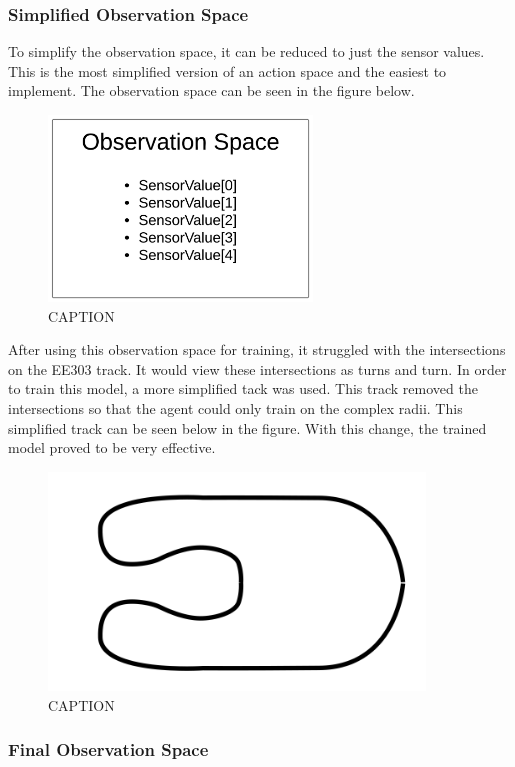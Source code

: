 \documentclass[12pt]{article}
\begin{document}
\subsubsection{Simplified Observation Space}

To simplify the observation space, it can be reduced to just the sensor values. This is the most simplified version of an action space and the easiest to implement. The observation space can be seen in the figure below. 

\begin{figure}[H]
\label{fig:}
\centering
\includegraphics[width=7cm]{imgs/SimpleObsSpace.png}
\caption{CAPTION}
\end{figure}
 
After using this observation space for training, it struggled with the intersections on the EE303 track. It would view these intersections as turns and turn. In order to train this model, a more simplified tack was used. This track removed the intersections so that the agent could only train on the complex radii. This simplified track can be seen below in the figure. With this change, the trained model proved to be very effective.

\begin{figure}[H]
\label{fig:}
\centering
\includegraphics[width=10cm]{imgs/SimpleTrack.png}
\caption{CAPTION}
\end{figure}

 
\subsubsection{Final Observation Space}
\end{document}
